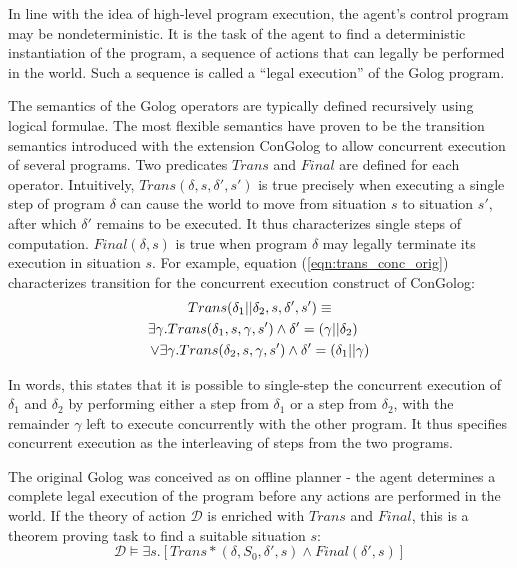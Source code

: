 \documentclass{llncs}
\begin{document}
In line with the idea of high-level program execution, the agent's
control program may be nondeterministic. It is the task of the agent to
find a deterministic instantiation of the program, a sequence of actions
that can legally be performed in the world. Such a sequence is called a ``legal
execution'' of the Golog program.

The semantics of the Golog operators are typically defined recursively
using logical formulae. The most flexible semantics have proven to
be the transition semantics introduced with the extension ConGolog
\cite{giacomo00congolog} to allow concurrent execution of several
programs. Two predicates $Trans$ and $Final$ are defined for each
operator. Intuitively, $Trans(\delta,s,\delta',s')$ is true precisely
when executing a single step of program $\delta$ can cause the world
to move from situation $s$ to situation $s'$, after which $\delta'$
remains to be executed. It thus characterizes single steps of computation.
$Final(\delta,s)$ is true when program
$\delta$ may legally terminate its execution in situation $s$.  For example,
equation (\ref{eqn:trans_conc_orig}) characterizes transition for the 
concurrent execution construct of ConGolog:
\begin{multline}
\label{eqn:trans_conc_orig}
Trans(\delta_{1}||\delta_{2},s,\delta',s')\equiv\\
\shoveright{\exists\gamma. Trans(\delta_{1},s,\gamma,s')\wedge \delta'=(\gamma||\delta_2)}\\
\vee\exists\gamma. Trans(\delta_{2},s,\gamma,s')\wedge \delta'=(\delta_1 || \gamma)
\end{multline}

In words, this states that it is possible to single-step the concurrent
execution of $\delta_1$ and $\delta_2$ by performing either a step from
$\delta_1$ or a step from $\delta_2$, with the remainder $\gamma$ left
to execute
concurrently with the other program.
It thus specifies concurrent execution as the interleaving of steps from
the two programs.

The original Golog was conceived as on offline planner - the agent
determines a complete legal execution of the program before any actions
are performed in the world.  If the theory of action $\mathcal{D}$ is enriched
with $Trans$ and $Final$, this is a theorem proving task to find a suitable
situation $s$:
\begin{equation}
\label{eqn:golog_execution}
\mathcal{D}\models\exists s.\left[Trans*(\delta,S_{0},\delta',s)\wedge Final(\delta',s)\right]
\end{equation}
\end{document}
